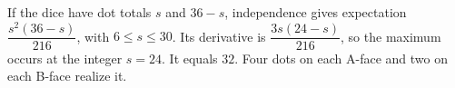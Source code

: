 If the dice have dot totals $s$ and $36-s$, independence gives expectation $\dfrac{s^2(36-s)}{216}$, with $6\le s\le30$. Its derivative is $\dfrac{3s(24-s)}{216}$, so the maximum occurs at the integer $s=24$. It equals $\boxed{32}$. Four dots on each A-face and two on each B-face realize it.
